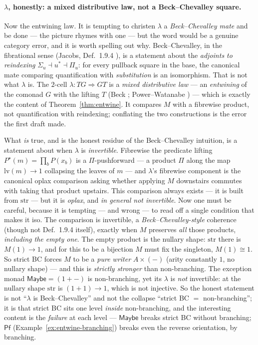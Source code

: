 \documentclass[11pt,a4paper]{book}
\newcommand{\str}{\mathrm{str}}
\theoremstyle{plain}
\theoremstyle{definition}
\theoremstyle{remark}
\begin{document}
\paragraph{$\lambda$, honestly: a mixed distributive law, not a Beck--Chevalley square.} Now the entwining
law. It is tempting to christen $\lambda$ a \emph{Beck--Chevalley mate} and be done --- the picture rhymes
with one --- but the word would be a genuine category error, and it is worth spelling out why. Beck--Chevalley,
in the fibrational sense (Jacobs, Def.~1.9.4 \cite{Jacobs99}), is a statement about the \emph{adjoints to
reindexing} $\Sigma_{u}\dashv u^{*}\dashv\Pi_{u}$: for every pullback square in the base, the canonical mate
comparing quantification with \emph{substitution} is an isomorphism. That is not what $\lambda$ is. The
$2$-cell $\lambda\colon TG\Rightarrow GT$ is a \emph{mixed distributive law} --- an \emph{entwining} of the
comonad $G$ with the lifting $T$ (Beck \cite{Beck69}; Power--Watanabe \cite{PowerWatanabe02}) --- which is
exactly the content of Theorem~\ref{thm:entwine}. It compares $M$ with a fibrewise product, not quantification
with reindexing; conflating the two constructions is the error the first draft made.

What \emph{is} true, and is the honest residue of the Beck--Chevalley intuition, is a statement about when
$\lambda$ is \emph{invertible}. Fibrewise the predicate lifting $P^{\star}(m)=\prod_{b}P(x_{b})$ is a
$\Pi$-pushforward --- a product $\Pi$ along the map $\mathrm{lv}(m)\to 1$ collapsing the leaves of $m$ --- and
$\lambda$'s fibrewise component is the canonical oplax comparison asking whether applying $M$ downstairs
commutes with taking that product upstairs. This comparison always exists --- it is built from $\str$ --- but
it is \emph{oplax}, and \emph{in general not invertible}. Now one must be careful, because it is tempting ---
and wrong --- to read off a single condition that makes it iso. The comparison is invertible, a
\emph{Beck--Chevalley-style} coherence (though not Def.~1.9.4 itself), exactly when $M$ preserves \emph{all}
those products, \emph{including the empty one}. The empty product is the nullary shape: $\str$ there is $M(1)\to 1$, and for this to be a
bijection $M$ must fix the singleton, $M(1)\cong 1$. So strict BC forces $M$ to be a \emph{pure writer}
$A\times(-)$ (arity constantly $1$, no nullary shape) --- and this is \emph{strictly stronger} than
non-branching. The exception monad $\mathsf{Maybe}=(1+-)$ is non-branching, yet its $\lambda$ is
\emph{not} invertible: at the nullary shape $\str$ is $(1+1)\to 1$, which is not injective. So the honest
statement is not ``$\lambda$ is Beck--Chevalley'' and not the collapse ``strict BC $=$ non-branching''; it
is that strict BC sits one level \emph{inside} non-branching, and the interesting content is the
\emph{failure} at each level --- $\mathsf{Maybe}$ breaks strict BC without branching; $\mathsf{Pf}$
(Example~\ref{ex:entwine-branching}) breaks even the reverse orientation, by branching.
\end{document}
